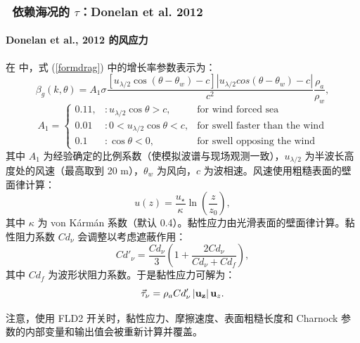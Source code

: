 \vsssub
\subsubsection{~依赖海况的 $\tau$：Donelan et al. 2012} \label{sec:FLD2}
\vsssub


\paragraph{Donelan et al., 2012 的风应力}
在 \citet{art:Don12} 中，式 (\ref{formdrag}) 中的增长率参数表示为：
\begin{equation}
\beta_g(k,\theta)=A_1 \sigma \frac{\left[u_{\lambda/2} \cos(\theta-\theta_w)-c\right]\left| u_{\lambda/2}cos(\theta-\theta_w)-c \right|}{c^2}\frac{\rho_a}{\rho_w},
\end{equation}
\begin{equation}
A_{1}=\left\{
\begin{array}{lll} 
0.11, & :  u_{\lambda/2}\cos\theta>c,  &\mbox{for wind forced sea}\\
0.01 & :   0<u_{\lambda/2}\cos\theta<c, &\mbox{for swell faster than the wind}\\
0.1 & :  \cos\theta<0,  &\mbox{for swell opposing the wind}
\end{array}
\right.
\end{equation}
其中 $A_1$ 为经验确定的比例系数（使模拟波谱与现场观测一致），$u_{\lambda/2}$ 为半波长高度处的风速（最高取到 20 m），$\theta_w$ 为风向，$c$ 为波相速。风速使用粗糙表面的壁面律计算：
\begin{equation}
u(z)=\frac{u_\star}{\kappa}\ln\left(\frac{z}{z_0}\right),
\end{equation}
其中 $\kappa$ 为 von K\'arm\'an 系数（默认 0.4）。黏性应力由光滑表面的壁面律计算。黏性阻力系数 $Cd_\nu$ 会调整以考虑遮蔽作用：
\begin{equation}
Cd'_\nu=\frac{Cd_\nu}{3}\left(1+\frac{2 Cd_\nu}{Cd_\nu+Cd_f}\right),
\end{equation}
其中 $Cd_f$ 为波形状阻力系数。于是黏性应力可解为：
\begin{equation}
\vec{\tau}_\nu=\rho_a Cd'_\nu \left|{\bf u_{z}}\right|{\bf {u}}_{z}.
\end{equation}

注意，使用 FLD2 开关时，黏性应力、摩擦速度、表面粗糙长度和 Charnock 参数的内部变量和输出值会被重新计算并覆盖。
